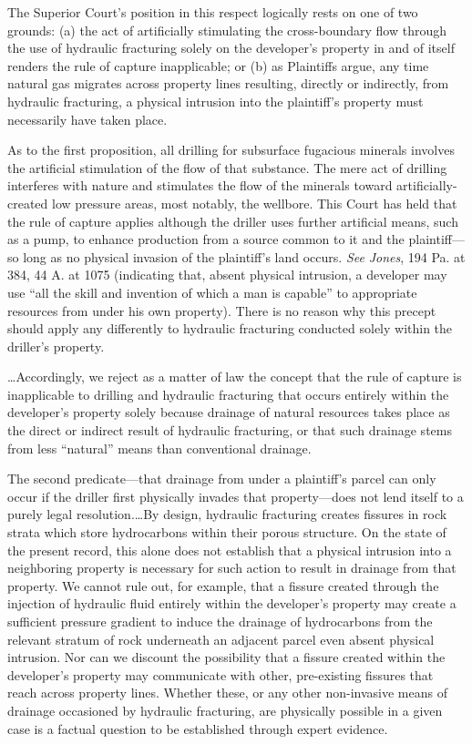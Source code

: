 The Superior Court's position in this respect logically rests on one of two
grounds: (a) the act of artificially stimulating the cross-boundary flow through
the use of hydraulic fracturing solely on the developer's property in and of
itself renders the rule of capture inapplicable; or (b) as Plaintiffs argue, any
time natural gas migrates across property lines resulting, directly or
indirectly, from hydraulic fracturing, a physical intrusion into the plaintiff's
property must necessarily have taken place.


As to the first proposition, all drilling for subsurface fugacious minerals
involves the artificial stimulation of the flow of that substance. The mere act
of drilling interferes with nature and stimulates the flow of the minerals
toward artificially-created low pressure areas, most notably, the wellbore. This
Court has held that the rule of capture applies although the driller uses
further artificial means, such as a pump, to enhance production from a source
common to it and the plaintiff---so long as no physical invasion of the
plaintiff's land occurs. \textit{See} \textit{Jones}, 194 Pa. at 384, 44 A. at
1075 (indicating that, absent physical intrusion, a developer may use ``all the
skill and invention of which a man is capable'' to appropriate resources from
under his own property). There is no reason why this precept should apply any
differently to hydraulic fracturing conducted solely within the driller's
property.


\ldots Accordingly, we reject as a matter of law the concept that the rule of
capture is inapplicable to drilling and hydraulic fracturing that occurs
entirely within the developer's property solely because drainage of natural
resources takes place as the direct or indirect result of hydraulic fracturing,
or that such drainage stems from less ``natural'' means than conventional
drainage.


The second predicate---that drainage from under a plaintiff's parcel can only
occur if the driller first physically invades that property---does not lend
itself to a purely legal resolution.\ldots By design, hydraulic fracturing
creates fissures in rock strata which store hydrocarbons within their porous
structure. On the state of the present record, this alone does not establish
that a physical intrusion into a neighboring property is necessary for such
action to result in drainage from that property. We cannot rule out, for
example, that a fissure created through the injection of hydraulic fluid
entirely within the developer's property may create a sufficient pressure
gradient to induce the drainage of hydrocarbons from the relevant stratum of
rock underneath an adjacent parcel even absent physical intrusion. Nor can we
discount the possibility that a fissure created within the developer's property
may communicate with other, pre-existing fissures that reach across property
lines. Whether these, or any other non-invasive means of drainage occasioned by
hydraulic fracturing, are physically possible in a given case is a factual
question to be established through expert evidence.


